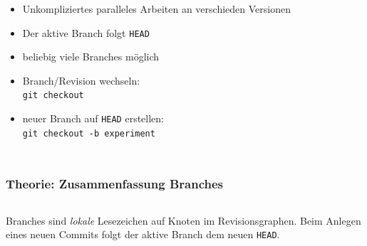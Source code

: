 \documentclass{beamer}
\begin{document}
\begin{frame}[label=branches10]
\begin{columns}
{\begin{tikzpicture}
    \end{tikzpicture}
} %
\begin{itemize}
\item Unkompliziertes paralleles Arbeiten an verschieden Versionen
\item<2-> Der aktive Branch folgt \texttt{HEAD}
\item<3-> beliebig viele Branches möglich
\item<4-> Branch/Revision wechseln:\\ \texttt{git checkout }
\item<8-> neuer Branch auf \texttt{HEAD} erstellen:\\ \texttt{git checkout -b experiment}
\end{itemize}
\end{columns}
\end{frame}


\begin{frame}
\frametitle{Theorie: Zusammenfassung Branches}
\begin{columns}

  \begin{center}
    \Large Branches sind \emph{lokale} Lesezeichen auf Knoten im
    Revisionsgraphen. Beim Anlegen eines neuen Commits folgt der aktive
    Branch dem neuen \texttt{HEAD}.
  \end{center}
\end{columns}
\end{frame}
\end{document}
